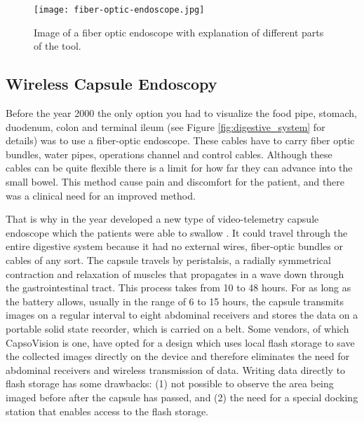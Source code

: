 \documentclass[thesis.tex]{subfiles}
\begin{document}
\begin{figure}[h] %
  \begin{center}
    \texttt{[image: fiber-optic-endoscope.jpg]}
    \caption[Image of a fiber optic endoscope with explanation of different parts of the tool]{Image of a fiber optic endoscope with explanation of different parts of the tool\footnotemark.}
    \label{fig:fiber-optic-endoscopy}
  \end{center}
\end{figure}




\subsection{Wireless Capsule Endoscopy}  \label{sec:wireless_capsule_endoscopy}
Before the year 2000 the only option you had to visualize the food pipe, stomach, duodenum, colon and terminal ileum (see Figure \ref{fig:digestive_system} for details) was to use a fiber-optic endoscope. These cables have to carry fiber optic bundles, water pipes, operations channel and control cables. Although these cables can be quite flexible there is a limit for how far they can advance into the small bowel. This method cause pain and discomfort for the patient, and there was a clinical need for an improved method.

That is why in the year \citeyear{WirelessCapsule00} \citeauthor*{WirelessCapsule00} developed a new type of video-telemetry capsule endoscope which the patients were able to swallow \cite{WirelessCapsule00}. It could travel through the entire digestive system because it had no external wires, fiber-optic bundles or cables of any sort. The capsule travels by peristalsis, a radially symmetrical contraction and relaxation of muscles that propagates in a wave down through the gastrointestinal tract. This process takes from 10 to 48 hours. For as long as the battery allows, usually in the range of 6 to 15 hours, the capsule transmits images on a regular interval to eight abdominal receivers and stores the data on a portable solid state recorder, which is carried on a belt. 
Some vendors, of which CapsoVision is one, have opted for a design which uses local flash storage to save the collected images directly on the device and therefore eliminates the need for abdominal receivers and wireless transmission of data. Writing data directly to flash storage has some drawbacks: (1) not possible to observe the area being imaged before after the capsule has passed, and (2) the need for a special docking station that enables access to the flash storage.
\end{document}
